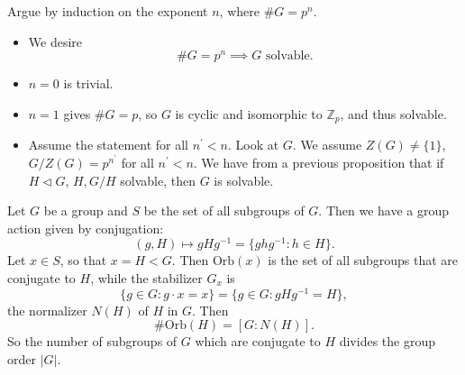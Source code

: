 Argue by induction on the exponent $n$, where $\# G = p^n$.
\begin{itemize}
  \item{ We desire
  $$
  \# G = p^n \implies G \text{ solvable}.
  $$
  }
  \item{$n=0$ is trivial.}
  \item{$n=1$ gives $\# G = p$, so $G$ is cyclic and isomorphic to
        $\mathbb{Z}_p$, and thus solvable.}
  \item{Assume the statement for all $n^\prime < n$. Look at
        $G$. We assume $Z(G) \neq \{ 1 \}$, $G / Z(G) = p^{n^\prime}$ for
        all $n^\prime < n$. We have from a previous proposition that
        if $H \triangleleft G$, $H, G/H$ solvable, then $G$ is
        solvable.
        }
\end{itemize}

\begin{xmpl}
Let $G$ be a group and $S$ be the set of all subgroups of $G$. Then
we have a group action given by conjugation:
$$
(g, H) \mapsto gHg^{-1} = \{ g h g^{-1} : h \in H \}.
$$
Let $x \in S$, so that $x = H < G$. Then $\mathrm{Orb}(x)$ is the set of
all subgroups that are conjugate to $H$, while the stabilizer $G_x$ is
$$
\{ g \in G : g \cdot x = x \} = \{ g \in G : g H g^{-1} = H \},
$$
the normalizer $N(H)$ of $H$ in $G$. Then
$$
\# \mathrm{Orb}(H) = [G : N(H)].
$$
So the number of subgroups of $G$ which are conjugate to $H$ divides
the group order $|G|$.
\end{xmpl}

